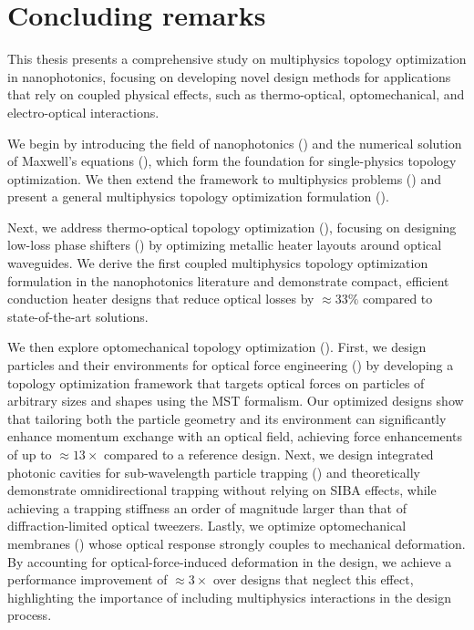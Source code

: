 \chapter{Concluding remarks}

This thesis presents a comprehensive study on multiphysics topology optimization in nanophotonics, focusing on developing novel design
methods for applications that rely on coupled physical effects, such as thermo-optical, optomechanical, and electro-optical interactions.

We begin by introducing the field of nanophotonics () and the numerical solution of Maxwell's equations
(), which form the foundation for single-physics topology optimization. We then extend the framework to multiphysics
problems () and present a general multiphysics topology optimization formulation ().

Next, we address thermo-optical topology optimization (), focusing on designing low-loss phase shifters
 () by optimizing metallic heater layouts around optical waveguides. We derive the first coupled multiphysics topology optimization formulation
in the nanophotonics literature and demonstrate compact, efficient conduction heater designs that reduce optical losses by
$\approx 33\%$ compared to state-of-the-art solutions.

We then explore optomechanical topology optimization (). First, we design particles and their environments for optical
force engineering () by developing a topology optimization framework that targets optical forces on particles of
arbitrary sizes and shapes using the MST formalism. Our optimized designs show that tailoring both the particle geometry and its
environment can significantly enhance momentum exchange with an optical field, achieving force enhancements of up to
$\approx 13\times$ compared to a reference design. Next, we design integrated photonic cavities for sub-wavelength particle trapping
() and theoretically demonstrate omnidirectional trapping without relying on SIBA effects, while achieving a trapping stiffness
an order of magnitude larger than that of diffraction-limited optical tweezers. Lastly, we optimize optomechanical membranes
() whose optical response strongly couples to mechanical deformation. By accounting for
optical-force-induced deformation in the design, we achieve a performance improvement of $\approx 3\times$ over designs that
neglect this effect, highlighting the importance of including multiphysics interactions in the design process.

